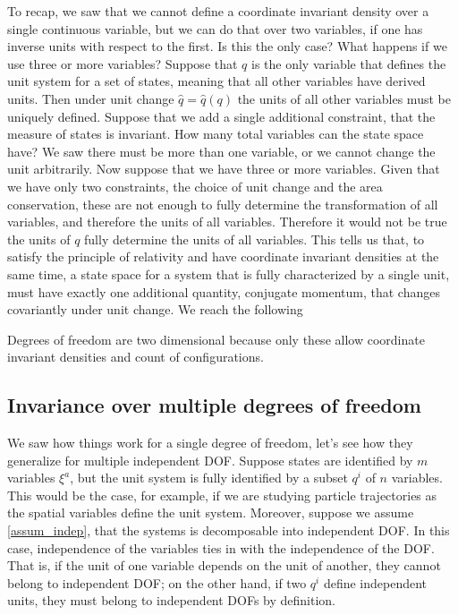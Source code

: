 To recap, we saw that we cannot define a coordinate invariant density over a single continuous variable, but we can do that over two variables, if one has inverse units with respect to the first. Is this the only case? What happens if we use three or more variables? Suppose that $q$ is the only variable that defines the unit system for a set of states, meaning that all other variables have derived units. Then under unit change $\hat{q} = \hat{q}(q)$ the units of all other variables must be uniquely defined. Suppose that we add a single additional constraint, that the measure of states is invariant. How many total variables can the state space have? We saw there must be more than one variable, or we cannot change the unit arbitrarily. Now suppose that we have three or more variables. Given that we have only two constraints, the choice of unit change and the area conservation, these are not enough to fully determine the transformation of all variables, and therefore the units of all variables. Therefore it would not be true the units of $q$ fully determine the units of all variables. This tells us that, to satisfy the principle of relativity and have coordinate invariant densities at the same time, a state space for a system that is fully characterized by a single unit, must have exactly one additional quantity, conjugate momentum, that changes covariantly under unit change. We reach the following
\begin{insight}
	Degrees of freedom are two dimensional because only these allow coordinate invariant densities and count of configurations.
\end{insight}


\subsection{Invariance over multiple degrees of freedom}



We saw how things work for a single degree of freedom, let's see how they generalize for multiple independent DOF. Suppose states are identified by $m$ variables $\xi^a$, but the unit system is fully identified by a subset $q^i$ of $n$ variables. This would be the case, for example, if we are studying particle trajectories as the spatial variables define the unit system. Moreover, suppose we assume \ref{assum_indep}, that the systems is decomposable into independent DOF. In this case, independence of the variables ties in with the independence of the DOF. That is, if the unit of one variable depends on the unit of another, they cannot belong to independent DOF; on the other hand, if two $q^i$ define independent units, they must belong to independent DOFs by definition.

